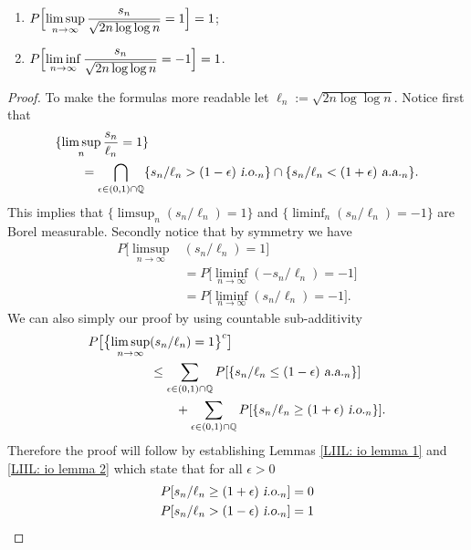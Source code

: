 \begin{theorem}$\phantom{asdf}$
\label{thm: Law of the iterated logarithm}
\begin{enumerate}
\item\label{LIIL} $P\Bigl[  \displaystyle\limsup_{n\rightarrow\infty} \frac{s_n}{\sqrt{2n\log\log n}} =1 \Bigr]=1$;
\item $P\Bigl[  \displaystyle\liminf_{n\rightarrow\infty}  \frac{s_n}{\sqrt{2n\log\log n}} =-1 \Bigr]=1$.
\end{enumerate}
\end{theorem}

\begin{proof}
To make the formulas more readable let $\ell_n:=\sqrt{2n\log\log n}$.
Notice first that
 \begin{align*}
 &\{ \limsup_n \frac{s_n}{\ell_n}=1  \}\\
 &\qquad=\bigcap_{\epsilon\in (0,1)\cap \Bbb Q} \{ {s_n/\ell_n}> (1-\epsilon) {\,\,\text{\sl i.o.} }_n \}\cap \{ {s_n/\ell_n}< (1+\epsilon) {\,\,\text{\sl a.a.} }_n \}.
 \end{align*}
  This implies that  $\{\limsup_n (s_n/\ell_n)=1  \}$  and $ \{\liminf_n (s_n/\ell_n)=-1  \}$ are Borel measurable.
Secondly notice that  by  symmetry we have
\begin{align*}
P\bigl[  \displaystyle\limsup_{n\rightarrow\infty} & (s_n/\ell_n) =1 \bigr] \\
& = P\bigl[  \displaystyle\liminf_{n\rightarrow\infty} (-s_n/\ell_n)  = -1 \bigr] \\
& = P\bigl[  \displaystyle\liminf_{n\rightarrow\infty} (s_n/\ell_n)  = -1 \bigr].
\end{align*}
We can also simply our proof by using countable sub-additivity
\begin{align*}
P\bigl[ \bigl\{ \displaystyle\limsup_{n\rightarrow\infty}& (s_n/\ell_n) =1\bigr\}^c \bigr]  \\
& \leq \sum_{\epsilon\in (0,1)\cap \Bbb Q} P[\{ {s_n/\ell_n}\leq (1-\epsilon) {\,\,\text{\sl a.a.} }_n \}] \\
&\qquad + \sum_{\epsilon\in (0,1)\cap \Bbb Q} P[\{ {s_n/\ell_n}\geq (1+\epsilon) {\,\,\text{\sl i.o.} }_n \}].
\end{align*}
Therefore the proof will follow by establishing Lemmas \ref{LIIL: io lemma 1}
 and \ref{LIIL: io lemma 2} which state that for all $\epsilon>0$
 \begin{align*}
P[ s_n/\ell_n \geq  (1+\epsilon) {\,\,\text{\sl i.o.} }_n ] &= 0 \\
P[ s_n/\ell_n > (1-\epsilon) {\,\,\text{\sl i.o.} }_n ] &= 1
\end{align*}

\end{proof}


